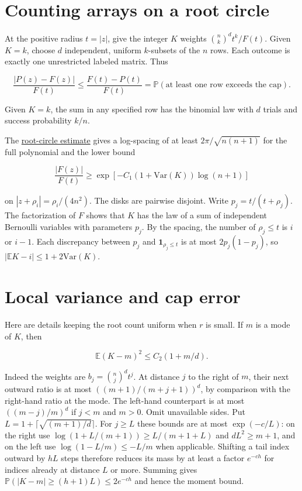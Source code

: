 \documentclass[11pt]{article}
\begin{document}
\section{Counting arrays on a root circle}

At the positive radius $t=|z|$, give the integer $K$ weights $\binom nk^d t^k/F(t)$. Given $K=k$, choose $d$ independent, uniform $k$-subsets of the $n$ rows. Each outcome is exactly one unrestricted labeled matrix. Thus

\[
\frac{|P(z)-F(z)|}{F(t)}
\le\frac{F(t)-P(t)}{F(t)}
=\mathbb P(\text{at least one row exceeds the cap}).
\]

Given $K=k$, the sum in any specified row has the binomial law with $d$ trials and success probability $k/n$.

The \hyperref[app:full]{root-circle estimate} gives a log-spacing of at least $2\pi/\sqrt{n(n+1)}$ for the full polynomial and the lower bound

\[
\frac{|F(z)|}{F(t)}
\ge \exp[-C_1(1+\mathrm{Var}(K))\log(n+1)]
\]

on $|z+\rho_i|=\rho_i/(4n^2)$. The disks are pairwise disjoint. Write $p_j=t/(t+\rho_j)$. The factorization of $F$ shows that $K$ has the law of a sum of independent Bernoulli variables with parameters $p_j$. By the spacing, the number of $\rho_j\le t$ is $i$ or $i-1$. Each discrepancy between $p_j$ and $\mathbf1_{\rho_j\le t}$ is at most $2p_j(1-p_j)$, so $|\mathbb E K-i|\le1+2\mathrm{Var}(K)$.

\section{Local variance and cap error}

Here are details keeping the root count uniform when $r$ is small. If $m$ is a mode of $K$, then

\[
\mathbb E(K-m)^2\le C_2(1+m/d).
\]

Indeed the weights are $b_j=\binom nj^d t^j$. At distance $j$ to the right of $m$, their next outward ratio is at most $((m+1)/(m+j+1))^d$, by comparison with the right-hand ratio at the mode. The left-hand counterpart is at most $((m-j)/m)^d$ if $j<m$ and $m>0$. Omit unavailable sides. Put $L=1+\lceil\sqrt{(m+1)/d}\rceil$. For $j\ge L$ these bounds are at most $\exp(-c/L)$: on the right use $\log(1+L/(m+1))\ge L/(m+1+L)$ and $dL^2\ge m+1$, and on the left use $\log(1-L/m)\le-L/m$ when applicable. Shifting a tail index outward by $hL$ steps therefore reduces its mass by at least a factor $e^{-ch}$ for indices already at distance $L$ or more. Summing gives $\mathbb P(|K-m|\ge(h+1)L)\le2e^{-ch}$ and hence the moment bound.
\end{document}
